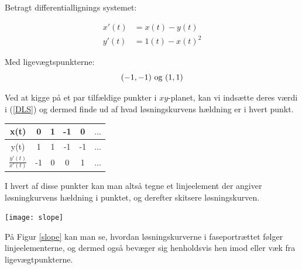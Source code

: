 \begin{Example}
\hfill \break
\textnormal{Betragt differentiallignings systemet:} 

\begin{equation}\label{DLS}
    \begin{aligned}
    x'(t)&=x(t)-y(t)\\ 
    y'(t)&=1(t)-x(t)^2
    \end{aligned}
\end{equation}

\textnormal{Med ligevægtspunkterne:} $$(-1,-1) \ \textnormal{og} \ (1,1)$$
\textnormal{}

\textnormal{Ved at kigge på et par tilfældige punkter i $xy$-planet, kan vi indsætte deres værdi i (\ref{DLS}) og dermed finde ud af hvad løsningskurvens hældning er i hvert punkt.} 

\begin{center}
  \begin{tabular}{ | c || c | c | c | c | c |}
    \hline
    x(t) & 0 & 1 & -1 & 0 & $\hdots$ \\ \hline 
    y(t) & 1 & 1 & -1 & -1 & $\hdots$\\ \hline \hline
    $\frac{y'(t)}{x'(t)}$ & -1 & 0 & 0 & 1 & $\hdots$\\ \hline
  \end{tabular}
\end{center}

\textnormal{I hvert af disse punkter kan man altså tegne et linjeelement der angiver løsningkurvens hældning i punktet, og derefter skitsere løsningskurven.}

\begin{center}
\texttt{[image: slope]}
\end{center}
 \label{slope}
\hfill \break

\textnormal{På Figur \ref{slope} kan man se, hvordan løsningskurverne i faseportrættet følger linjeelementerne, og dermed også bevæger sig henholdsvis hen  imod eller væk fra ligevægtpunkterne.}

\end{Example}

